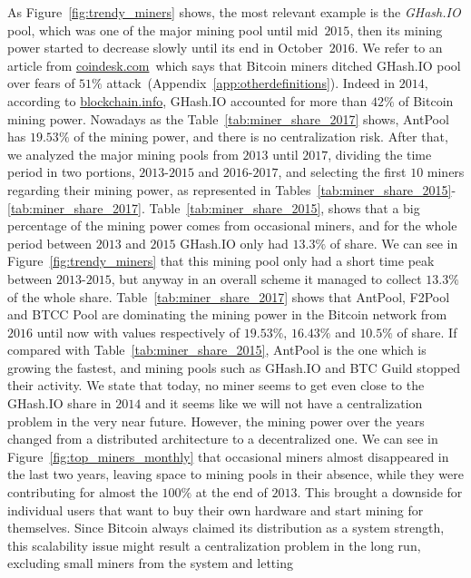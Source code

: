 \documentclass[USenglish]{uit-thesis}
\begin{document}
As Figure~\ref{fig:trendy_miners} shows,
the most relevant example is the \emph{GHash.IO}
pool, which was one of the major mining
pool until mid~$2015$, then its mining power started to decrease
slowly until its end in October~$2016$. We refer to an article
from \url{coindesk.com}\,\cite{coindesk_ghash_ditched}
which says that Bitcoin miners ditched GHash.IO pool over
fears of $51\%$ attack~(Appendix~\ref{app:otherdefinitions}).
Indeed in $2014$, according to \url{blockchain.info},
GHash.IO accounted for more than $42\%$ of Bitcoin mining power.
Nowadays as the Table~\ref{tab:miner_share_2017}
shows, AntPool has $19.53\%$ of
the mining power, and there is no centralization risk.
After that, we analyzed the major mining pools from $2013$ until $2017$,
dividing the time period in two portions,
$2013$-$2015$ and $2016$-$2017$,
and selecting the first $10$ miners regarding their mining power,
as represented in Tables~\ref{tab:miner_share_2015}-\ref{tab:miner_share_2017}.
Table~\ref{tab:miner_share_2015}, shows that a big percentage of the mining
power comes from occasional miners, and for the whole period
between $2013$ and $2015$ GHash.IO only had $13.3\%$ of
share. We can see in Figure~\ref{fig:trendy_miners}
that this mining pool only had a short time peak between $2013$-$2015$,
but anyway in an overall scheme it managed to collect $13.3\%$
of the whole share. Table~\ref{tab:miner_share_2017} shows that
AntPool, F2Pool and BTCC Pool are dominating the mining
power in the Bitcoin network from $2016$ until now with values
respectively of $19.53\%$, $16.43\%$ and $10.5\%$ of share.
If compared with Table~\ref{tab:miner_share_2015}, AntPool
is the one which is growing the fastest, and mining
pools such as GHash.IO and BTC Guild stopped their activity.
We state that today, no miner seems to get
even close to the GHash.IO share in $2014$ and it
seems like we will not have
a centralization problem in the very near future.
However, the mining power over the years
changed from a distributed architecture to a decentralized one.
We can see in Figure~\ref{fig:top_miners_monthly} that
occasional miners almost disappeared in the last two years,
leaving space to mining pools in their absence,
while they were contributing
for almost the $100\%$ at the end of $2013$. This brought a
downside for individual users that want to buy
their own hardware and start mining for themselves.
Since Bitcoin always claimed its distribution as a 
system strength, this scalability issue
might result a centralization problem in the long run,
excluding small miners from the system and letting
\end{document}
